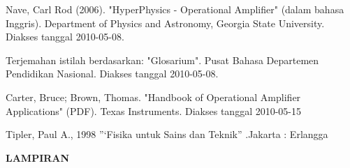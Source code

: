 \documentclass[12pt,a4paper]{article}
\begin{document}
\newpage
\begin{thebibliography}{99} %
 {Nave, Carl Rod (2006). "HyperPhysics - Operational Amplifier" (dalam bahasa Inggris). Department of Physics and Astronomy, Georgia State University. Diakses tanggal 2010-05-08. }

 {Terjemahan istilah berdasarkan: "Glosarium". Pusat Bahasa Departemen Pendidikan Nasional. Diakses tanggal 2010-05-08.}

 {Carter, Bruce; Brown, Thomas. "Handbook of Operational Amplifier Applications" (PDF). Texas Instruments. Diakses tanggal 2010-05-15}

 {Tipler, Paul A., 1998 ”‘Fisika untuk Sains dan Teknik” .Jakarta : Erlangga }

\end{thebibliography}

\newpage
\begin{center}
\large{\textbf{LAMPIRAN}}
\end{center}
\end{document}
